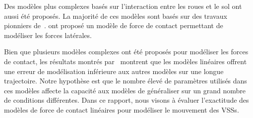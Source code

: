 Des modèles plus complexes basés sur l'interaction entre les roues et le sol ont aussi été proposés.
La majorité de ces modèles sont basés sur des travaux pionniers de~\citet{Wong1967}.
\citet{Ishigami2007} ont proposé un modèle de force de contact permettant de modéliser les forces latérales. 

Bien que plusieurs modèles complexes ont été proposés pour modéliser les forces de contact, les résultats montrés par~\citet{Seegmiller2016} montrent que les modèles linéaires offrent une erreur de modélisation inférieure aux autres modèles sur une longue trajectoire.
Notre hypothèse est que le nombre élevé de paramètres utilisés dans ces modèles affecte la capacité aux modèles de généraliser sur un grand nombre de conditions différentes.
Dans ce rapport, nous visons à évaluer l'exactitude des modèles de force de contact linéaires pour modéliser le mouvement des \acp{VSS}.
